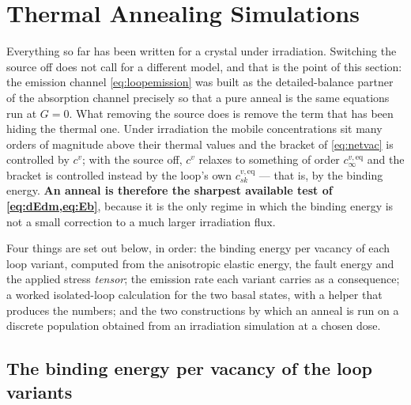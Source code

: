 \documentclass{article}
\begin{document}
\section{Thermal Annealing Simulations}
\label{sec:annealing}

Everything so far has been written for a crystal under irradiation. Switching the
source off does not call for a different model, and that is the point of this
section: the emission channel \cref{eq:loopemission} was built as the
detailed-balance partner of the absorption channel precisely so that a pure
anneal is the same equations run at $G=0$. What removing the source does is
remove the term that has been hiding the thermal one. Under irradiation the
mobile concentrations sit many orders of magnitude above their thermal values and
the bracket of \cref{eq:netvac} is controlled by $c^{v}$; with the source off,
$c^{v}$ relaxes to something of order $c^{v,\mathrm{eq}}_{\infty}$ and the bracket
is controlled instead by the loop's own $c^{v,\mathrm{eq}}_{sk}$ --- that is, by
the binding energy. \textbf{An anneal is therefore the sharpest available test of
\cref{eq:dEdm,eq:Eb}}, because it is the only regime in which the binding energy
is not a small correction to a much larger irradiation flux.

Four things are set out below, in order: the binding energy per vacancy of each
loop variant, computed from the anisotropic elastic energy, the fault energy and
the applied stress \emph{tensor}; the emission rate each variant carries as a
consequence; a worked isolated-loop calculation for the two basal states, with a
helper that produces the numbers; and the two constructions by which an anneal is
run on a discrete population obtained from an irradiation simulation at a chosen
dose.

\subsection{The binding energy per vacancy of the loop variants}
\label{sec:anneal-binding}
\end{document}
